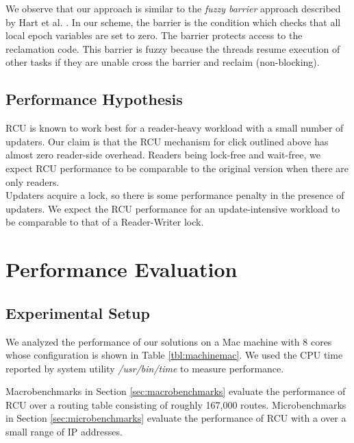 \documentclass[a4paper,marginparwidth=50pt,marginparsep=10pt]{article}
\begin{document}
We observe that our approach is similar to the \emph{fuzzy barrier} approach described by Hart et al. \cite{hart}. In our scheme, the barrier is the condition which checks that all local epoch variables are set to zero. The barrier protects access to the reclamation code. This barrier is fuzzy because the threads resume execution of other tasks if they are unable cross the barrier and reclaim (non-blocking).\\
  
\subsection{Performance Hypothesis}
\label{sec:perfhypothesis}
RCU is known to work best for a reader-heavy workload with a small number of updaters. Our claim is that the RCU mechanism for click outlined above has almost zero reader-side overhead. Readers being lock-free and wait-free, we expect RCU performance to be comparable to the original version when there are only readers.\\

Updaters acquire a lock, so there is some performance penalty in the presence of updaters. We expect the RCU performance for an update-intensive workload to be comparable to that of a Reader-Writer lock.

\section{Performance Evaluation}
\label{sec:perfeval}
\subsection{Experimental Setup}
We analyzed the performance of our solutions on a Mac machine with 8 cores whose configuration is shown in Table \ref{tbl:machinemac}.
We used the CPU time reported by system utility \emph{/usr/bin/time} to measure performance.

Macrobenchmarks in Section \ref{sec:macrobenchmarks} evaluate the performance of RCU over a routing table consisting of roughly 167,000 routes. Microbenchmarks in Section \ref{sec:microbenchmarks} evaluate the performance of RCU with a over a small range of IP addresses.
\end{document}
